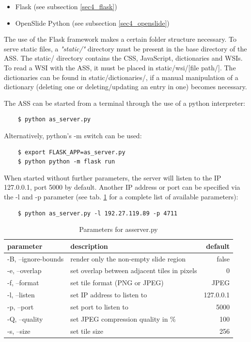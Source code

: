 \begin{itemize}
	\item Flask\cite{web:flask} (see subsection \ref{sec4_flask})
	\item OpenSlide Python\cite{web:openslide} (see subsection \ref{sec4_openslide})
\end{itemize}

The use of the Flask framework makes a certain folder structure necessary\cite{web:flask}. To serve static files, a \emph{"static/"} directory must be present in the base directory of the ASS. The static/ directory contains the CSS, JavaScript, dictionaries and WSIs. To read a WSI with the ASS, it must be placed in static/wsi/[file path/]. The dictionaries can be found in static/dictionaries/, if a manual manipulation of a dictionary (deleting one or deleting/updating an entry in one) becomes necessary.

The ASS can be started from a terminal through the use of a python interpreter:
\begin{lstlisting}
	$ python as_server.py
\end{lstlisting}

Alternatively, python's -m switch can be used:
\begin{lstlisting}
	$ export FLASK_APP=as_server.py
	$ python python -m flask run
\end{lstlisting}

When started without further parameters, the server will listen to the IP 127.0.0.1, port 5000 by default. Another IP address or port can be specified via the -l and -p parameter (see tab. \ref{tab4_assParams} for a complete list of available parameters):
\begin{lstlisting}
	$ python as_server.py -l 192.27.119.89 -p 4711
\end{lstlisting}

\begin{table}[H]
	\begin{center}
		\begin{tabular}{| l | l | r |}
			\hline
			\textbf{parameter} & \textbf{description} & \textbf{default}\\ \hline
			-B, --ignore-bounds & render only the non-empty slide region & false\\ \hline
			-e, --overlap & set overlap between adjacent tiles in pixels & 0 \\ \hline
			-f, --format & set tile format (PNG or JPEG) & JPEG \\ \hline
			-l, --listen & set IP address to listen to & 127.0.0.1\\ \hline
			-p, --port & set port to listen to & 5000\\ \hline
			-Q, --quality & set JPEG compression quality in \% & 100\\ \hline
			-s, --size & set tile size & 256\\ \hline
		\end{tabular}
		\caption{Parameters for as{\textunderscore}server.py}
		\label{tab4_assParams}
	\end{center}
\end{table}

